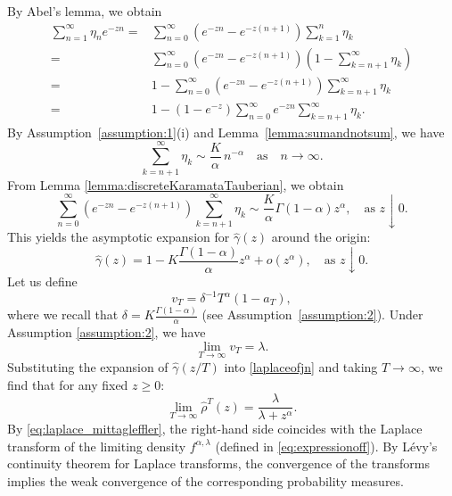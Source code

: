 \documentclass[letterpaper]{article}
\numberwithin{equation}{section}
\theoremstyle{definition}
\theoremstyle{remark}
\begin{document}
By Abel's lemma, we obtain
\begin{align*}
  {\sum_{n=1}^\infty \eta_ne^{-zn}}
  =&{\sum_{n=0}^\infty\left( e^{-zn}-e^{-z(n+1)} \right)\sum_{k=1}^n \eta_k}\\
  =&{\sum_{n=0}^\infty \left( e^{-zn}-e^{-z(n+1)} \right)\left( 1-\sum_{k=n+1}^\infty \eta_k \right)}\\
  =&{1-\sum_{n=0}^\infty\left( e^{-zn}-e^{-z(n+1)} \right)\sum_{k=n+1}^\infty\eta_k}\\
  =&{1-(1-e^{-z})\sum_{n=0}^\infty e^{-zn}\sum_{k=n+1}^\infty \eta_k.}
\end{align*}
{By Assumption~\ref{assumption:1}(i) and Lemma~\ref{lemma:sumandnotsum}, we have}
\[
  {\sum_{k=n+1}^\infty \eta_k \sim \frac{K}{\alpha}\,n^{-\alpha}\quad\text{as}\quad n\to\infty.}
\] 
From Lemma \ref{lemma:discreteKaramataTauberian}, we obtain
\[
  \sum_{n=0}^\infty\left( e^{-zn}-e^{-z(n+1)} \right)\sum_{k=n+1}^\infty\eta_k\sim \frac{K}{\alpha}\Gamma(1-\alpha)z^\alpha, \quad \text{as } z \downarrow 0.
\]
This yields the asymptotic expansion for $\hat\gamma(z)$ around the origin:
\[
  \hat\gamma(z) = 1-K\frac{\Gamma(1-\alpha)}{\alpha}z^\alpha+o(z^\alpha), \quad \text{as } z \downarrow 0.
\]
Let us define 
\begin{equation}\label{deltav}
  v_T=\delta^{-1}T^\alpha(1-a_T),
\end{equation}
{where we recall that $\delta=K\frac{\Gamma(1-\alpha)}{\alpha}$ (see Assumption~\ref{assumption:2}).}
Under Assumption \ref{assumption:2}, we have
\[
  {\lim_{T\to\infty} v_T = \lambda.}
\]
Substituting the expansion of $\hat\gamma(z/T)$ into \eqref{laplaceofjn} and taking $T\to\infty$, we find that for any fixed $z \ge 0$:
\[
  {\lim_{T\to\infty} \hat\rho^T(z) = \frac{\lambda}{\lambda+z^\alpha}.}
\]
{By \eqref{eq:laplace_mittagleffler}, the right-hand side coincides with the Laplace transform of the limiting density $f^{\alpha,\lambda}$ (defined in \eqref{eq:expressionoff}).} By L\'evy's continuity theorem for Laplace transforms, the convergence of the transforms implies the weak convergence of the corresponding probability measures.
\end{document}
